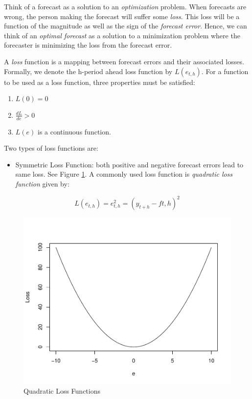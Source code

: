 \documentclass[]{book}
\providecommand{\tightlist}{%
  \setlength{\itemsep}{0pt}\setlength{\parskip}{0pt}}
\theoremstyle{definition}
\theoremstyle{definition}
\theoremstyle{definition}
\theoremstyle{remark}
\let\BeginKnitrBlock\begin \let\EndKnitrBlock\end
\begin{document}
Think of a forecast as a solution to an \emph{optimization} problem.
When forecasts are wrong, the person making the forecast will suffer
some \emph{loss}. This loss will be a function of the magnitude as well
as the sign of the \emph{forecast error}. Hence, we can think of an
\emph{optimal forecast} as a solution to a minimization problem where
the forecaster is minimizing the loss from the forecast error.

\BeginKnitrBlock{definition}[Loss Function]
\protect\hypertarget{def:d5}{}{\label{def:d5} {}
}
\EndKnitrBlock{definition}

A \emph{loss} function is a mapping between forecast errors and their
associated losses. Formally, we denote the h-period ahead loss function
by \(L(e_{t,h})\). For a function to be used as a loss function, three
properties must be satisfied:

\begin{enumerate}
\def\labelenumi{\arabic{enumi}.}
\tightlist
\item
  \(L(0)=0\)
\item
  \(\frac{dL}{de}>0\)
\item
  \(L(e)\) is a continuous function.
\end{enumerate}

Two types of loss functions are:

\begin{itemize}
\tightlist
\item
  Symmetric Loss Function: both positive and negative forecast errors
  lead to same loss. See Figure \ref{fig:ch1-figure5}. A commonly used
  loss function is \emph{quadratic loss function} given by:
\end{itemize}

\begin{equation}
L(e_{t,h})=e_{t,h}^2 = (y_{t+h}-f{t,h})^2
\end{equation}

\begin{figure}

{\centering \includegraphics[width=0.8\linewidth]{bookdown-demo_files/figure-latex/ch1-figure5-1} 

}

\caption{Quadratic Loss Functions}\label{fig:ch1-figure5}
\end{figure}
\end{document}
